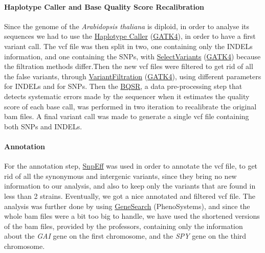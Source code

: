 \documentclass[10pt,a4paper]{article}
\begin{document}
\paragraph{Haplotype Caller and Base Quality Score Recalibration} Since the genome of the \textit{Arabidopsis thaliana} is diploid, in order to analyse its sequences we had to use the \href{https://software.broadinstitute.org/gatk/documentation/tooldocs/3.8-0/org_broadinstitute_gatk_tools_walkers_haplotypecaller_HaplotypeCaller.php}{Haplotype Caller} (\href{https://software.broadinstitute.org/gatk/}{GATK4}), in order to have a first variant call. The vcf file was then split in two, one containing only the INDELs information, and one containing the SNPs, with  \href{https://software.broadinstitute.org/gatk/documentation/tooldocs/3.8-0/org_broadinstitute_gatk_tools_walkers_variantutils_SelectVariants.php}{SelectVariants} (\href{https://software.broadinstitute.org/gatk/}{GATK4}) because the filtration methods differ.Then the new vcf files were filtered to get rid of all the false variants, through  \href{https://software.broadinstitute.org/gatk/documentation/tooldocs/3.8-0/org_broadinstitute_gatk_tools_walkers_filters_VariantFiltration.php}{VariantFiltration} (\href{https://software.broadinstitute.org/gatk/}{GATK4}), using different parameters for INDELs and for SNPs. Then the \href{https://gatkforums.broadinstitute.org/gatk/discussion/44/base-quality-score-recalibration-bqsr}{BQSR}, a data pre-processing step that detects systematic errors made by the sequencer when it estimates the quality score of each base call, was performed in two iteration to recalibrate the original bam files. A final variant call was made to generate a single vcf file containing both SNPs and INDELs. 

\paragraph{Annotation}
For the annotation step, \href{http://snpeff.sourceforge.net/}{SnpEff} was used in order to annotate the vcf file, to get rid of all the synonymous and intergenic variants, since they bring no new information to our analysis, and also to keep only the variants that are found in less than 2 strains. Eventually, we got a nice annotated and filtered vcf file. The analysis was further done by using \href{http://www.phenosystems.com/www/index.php/products/gensearchngs}{GeneSearch} (PhenoSystems), and since the whole bam files were a bit too big to handle, we have used the shortened versions of the bam files, provided by the professors, containing only the information about the \textit{GAI} gene on the first chromosome, and the \textit{SPY} gene on the third chromosome.
\end{document}
